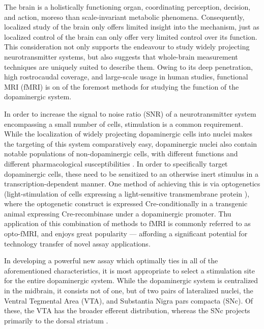 The brain is a holistically functioning organ, coordinating perception, decision, and action, moreso than scale-invariant metabolic phenomena.
Consequently, localized study of the brain only offers limited insight into the mechanism, just as localized control of the brain can only offer very limited control over its function.
This consideration not only supports the endeavour to study widely projecting neurotransmitter systems, but also suggests that whole-brain measurement techniques are uniquely suited to describe them.
Owing to its deep penetration, high rostrocaudal coverage, and large-scale usage in human studies, functional MRI (fMRI) is on of the foremost methods for studying the function of the dopaminergic system.

In order to increase the signal to noise ratio (SNR) of a neurotransmitter system encompassing a small number of cells, stimulation is a common requirement.
While the localization of widely projecting dopaminergic cells into nuclei makes the targeting of this system comparatively easy, dopaminergic nuclei also contain notable populations of non-dopaminergic cells, with different functions and different pharmacological susceptibilities \cite{Taylor2014}.
In order to specifically target dopaminergic cells, these need to be sensitized to an otherwise inert stimulus in a transcription-dependent manner.
One method of achieving this is via optogenetics (light-stimulation of cells expressing a light-sensitive transmembrane protein \cite{Boyden2005}), where the optogenetic construct is expressed Cre-conditionally \cite{Orban1992} in a transgenic animal expressing Cre-recombinase under a dopaminergic promoter.
Thu application of this combination of methods to fMRI is commonly referred to as opto-fMRI, and enjoys great popularity \cite{Desai2011,Grandjean2019} --- affording a significant potential for technology transfer of novel assay applications.

In developing a powerful new assay which optimally ties in all of the aforementioned characteristics, it is most appropriate to select a stimulation site for the entire dopaminergic system.
While the dopaminergic system is centralized in the midbrain, it consists not of one, but of two pairs of lateralized nuclei, the Ventral Tegmental Area (VTA), and Substantia Nigra pars compacta (SNc).
Of these, the VTA has the broader efferent distribution, whereas the SNc projects primarily to the dorsal striatum \cite{Pan2010}.


